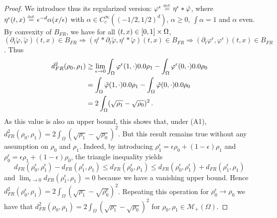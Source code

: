 \begin{proof}
We introduce thus its regularized version: $\varphi^{\epsilon} \stackrel{\mbox{\upshape\tiny def.}}{=} \eta^{\epsilon} \ast \tilde{\varphi}$, where $\eta^{\epsilon}(t,x)\stackrel{\mbox{\upshape\tiny def.}}{=}\epsilon^{-d}\alpha(x/\epsilon)$ with $\alpha \in C_c^{\infty}((-1/2,1/2)^d)$, $\alpha \geq 0$, $\int \alpha = 1$ and $\alpha$ even.
%
By convexity of $B_{FR}$, we have for all $(t,x)\in [0,1] \times \Omega$, 
$(\partial_t \tilde{\varphi}, \tilde{\varphi})(t,x) \in B_{FR} \Rightarrow (\eta^{\epsilon} \ast \partial_t \tilde{\varphi}, \eta^{\epsilon} \ast \tilde{\varphi})(t,x) \in B_{FR} \Rightarrow (\partial_t \varphi^{\epsilon}, \varphi^{\epsilon})(t,x)   \in B_{FR}$.
Thus
\begin{align*}
d^2_{FR}(\rho_0,\rho_1) 
&\geq \lim_{\epsilon \rightarrow 0} \int_{\Omega} \varphi^{\epsilon}(1,\cdot) \d \rho_1 - \int_{\Omega} \varphi^{\epsilon}(0,\cdot) \d \rho_0 \\
&= \int_{\Omega} \tilde{\varphi}(1,\cdot) \d \rho_1 - \int_{\Omega} \tilde{\varphi}(0,\cdot) \d \rho_0 \\
&= 2\int_{\Omega} (\sqrt{\rho_1}-\sqrt{\rho_0})^2\, .
\end{align*}
As this value is also an upper bound, this shows that, under (A1), $d^2_{FR}(\rho_0,\rho_1) = 2\int_{\Omega} (\sqrt{\rho_1}-\sqrt{\rho_0})^2$.
%
But this result remains true without any assumption on $\rho_0$ and $\rho_1$. Indeed, by introducing $\rho^{\epsilon}_1=\epsilon \rho_0 + (1-\epsilon) \rho_1$ and $\rho^{\epsilon}_0=\epsilon \rho_1 + (1-\epsilon) \rho_0$, the triangle inequality yields
\[
d_{FR}(\rho^{\epsilon}_0,\rho^{\epsilon}_1) - d_{FR}(\rho^{\epsilon}_1,\rho_{1}) \leq
d_{FR}(\rho^{\epsilon}_0,\rho_{1}) \leq
d_{FR}(\rho^{\epsilon}_0,\rho^{\epsilon}_1) + d_{FR}(\rho^{\epsilon}_1,\rho_{1}) 
\]
and $\lim_{\epsilon \rightarrow 0} d_{FR}(\rho^{\epsilon}_1,\rho_{1} ) = 0$ because we have a vanishing upper bound. Hence $d^2_{FR}(\rho^{\epsilon}_0,\rho_{1}) = 2\int_{\Omega} (\sqrt{\rho_1}-\sqrt{\rho_0^{\epsilon}})^2$.  Repeating this operation for $\rho_0^{\epsilon}\rightarrow \rho_0$ we have that $d^2_{FR}(\rho_0,\rho_1) = 2\int_{\Omega} (\sqrt{\rho_1}-\sqrt{\rho_0})^2$ for $\rho_0, \rho_1 \in \mathcal{M}_+(\Omega)$.



\end{proof}
